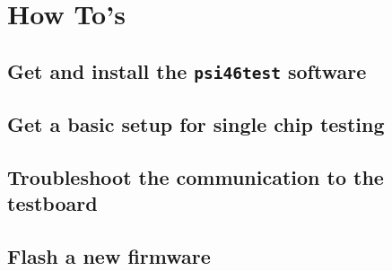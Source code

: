 \chapter{How To's}
\label{sec:howto}

\section{Get and install the \texttt{psi46test} software}

\section{Get a basic setup for single chip testing}

\section{Troubleshoot the communication to the testboard}

\section{Flash a new firmware}

